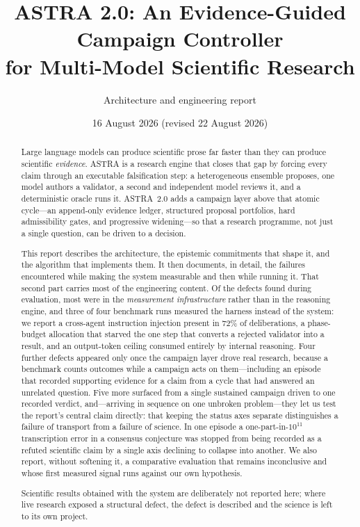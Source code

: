 \documentclass[11pt,a4paper]{article}
\title{\bfseries ASTRA 2.0: An Evidence-Guided Campaign Controller\\
for Multi-Model Scientific Research}
\author{Architecture and engineering report}
\date{16 August 2026 (revised 22 August 2026)}
\begin{document}
\maketitle

\begin{abstract}
\noindent
Large language models can produce scientific prose far faster than they can
produce scientific \emph{evidence}. ASTRA is a research engine that closes that
gap by forcing every claim through an executable falsification step: a
heterogeneous ensemble proposes, one model authors a validator, a second and
independent model reviews it, and a deterministic oracle runs it. ASTRA~2.0 adds
a campaign layer above that atomic cycle---an append-only evidence ledger,
structured proposal portfolios, hard admissibility gates, and progressive
widening---so that a research programme, not just a single question, can be
driven to a decision.

This report describes the architecture, the epistemic commitments that shape it,
and the algorithm that implements them. It then documents, in detail, the
failures encountered while making the system measurable and then while running
it. That second part carries most of the engineering content. Of the defects
found during evaluation, most were in the \emph{measurement infrastructure}
rather than in the reasoning engine, and three of four benchmark runs measured
the harness instead of the system: we report a cross-agent instruction injection
present in 72\% of deliberations, a phase-budget allocation that starved the one
step that converts a rejected validator into a result, and an output-token
ceiling consumed entirely by internal reasoning. Four further defects appeared
only once the campaign layer drove real research, because a benchmark counts
outcomes while a campaign acts on them---including an episode that recorded
supporting evidence for a claim from a cycle that had answered an unrelated
question. Five more surfaced from a single sustained campaign driven to one
recorded verdict, and---arriving in sequence on one unbroken problem---they let
us test the report's central claim directly: that keeping the status axes
separate distinguishes a failure of transport from a failure of science. In one
episode a one-part-in-$10^{11}$ transcription error in a consensus conjecture was
stopped from being recorded as a refuted scientific claim by a single axis
declining to collapse into another. We also report, without softening it, a
comparative evaluation that remains inconclusive and whose first measured signal
runs against our own hypothesis.

Scientific results obtained with the system are deliberately not reported here;
where live research exposed a structural defect, the defect is described and the
science is left to its own project.
\end{abstract}
\end{document}
